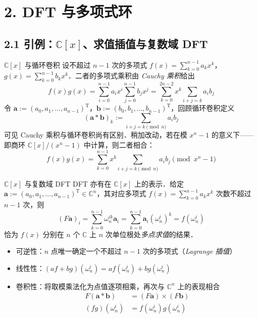 \documentclass[
  ignorenonframetext,
  chinese-hans,
]{beamer}
\providecommand{\tightlist}{%
  \setlength{\itemsep}{0pt}\setlength{\parskip}{0pt}}\usepackage{longtable,booktabs,array}
\theoremstyle{plain}
\theoremstyle{plain}
\theoremstyle{plain}
\theoremstyle{plain}
\theoremstyle{remark}
\begin{document}
\section{2. DFT 与多项式环}\label{dft-ux4e0eux591aux9879ux5f0fux73af}

\subsection{\texorpdfstring{2.1 引例：\(\mathbb C[x]\)、求值插值与复数域
DFT}{2.1 引例：\textbackslash mathbb C{[}x{]}、求值插值与复数域 DFT}}\label{ux5f15ux4f8bmathbb-cxux6c42ux503cux63d2ux503cux4e0eux590dux6570ux57df-dft}

\begin{frame}{\(\mathbb C[x]\) 与循环卷积}
\label{mathbb-cx-ux4e0eux5faaux73afux5377ux79ef}
设不超过 \(n-1\) 次的多项式
\(f(x) = \sum_{k=0}^{n-1} a_k x^k\)，\(g(x) = \sum_{k=0}^{n-1} b_k x^k\)．二者的多项式乘积由
\emph{Cauchy 乘积}给出 \[
f(x) g(x) = \sum_{i=0}^{n-1} a_i x^i \sum_{j=0}^{n-1} b_j x^j = \sum_{k=0}^{2n-2} x^k \sum_{i+j = k} a_i b_j
\] 令
\(\boldsymbol a := (a_0,a_1,\dots,a_{n-1})^\mathrm{T}\)，\(\boldsymbol b := (b_0,b_1,\dots,b_{n-1})^\mathrm{T}\)，回顾循环卷积定义
\[
(\boldsymbol a * \boldsymbol b)_k := \sum_{i + j = k \pmod{n}} a_i b_j
\] 可见 Cauchy 乘积与循环卷积尚有区别．稍加改动，若在模 \(x^n - 1\)
的意义下------即商环 \(\mathbb C[x]/(x^n-1)\) 中计算，则二者相合： \[
f(x) g(x) = \sum_{k=0}^{n-1} x^k \sum_{i + j = k \pmod{n}} a_i b_j \pmod{x^n - 1}
\]
\end{frame}

\begin{frame}{\(\mathbb C[x]\) 与复数域 DFT}
\label{mathbb-cx-ux4e0eux590dux6570ux57df-dft}
DFT 亦有在 \(\mathbb C[x]\) 上的表示．给定
\(\boldsymbol a := (a_0,a_1,\dots,a_{n-1})^\mathrm{T}\in \mathbb C^n\)，其对应多项式
\(f(x) = \sum_{k=0}^{n-1} a_k x^k\) 次数不超过 \(n-1\) 次，则 \[
(F \boldsymbol a)_i = \sum_{k=0}^{n-1} \omega_n^{ik} \boldsymbol a_i = \sum_{k=0}^{n-1} \boldsymbol a_i (\omega_n^i)^k = f(\omega_n^i)
\] 恰为 \(f(x)\) 分别在 \(n\) 个 \(\mathbb C\) 上 \(n\)
次单位根处\emph{多点求值}的结果．

\begin{itemize}
\tightlist
\item
  可逆性：\(n\) 点唯一确定一个不超过 \(n-1\) 次的多项式（\emph{Lagrange
  插值}）
\item
  线性性：\((af+bg) (\omega_n^i) = a f(\omega_n^i) + b g(\omega_n^i)\)
\item
  卷积性：将取模乘法化为点值逐项相乘，再次与 \(\mathbb C^n\)
  上的表现相合 \[
  \begin{aligned}
  F(\boldsymbol a * \boldsymbol b) &= (F \boldsymbol a) \times (F \boldsymbol b) \\
  (fg)(\omega_n^i) &= f(\omega_n^i) g(\omega_n^i)
  \end{aligned}
  \]
\end{itemize}
\end{frame}
\end{document}
